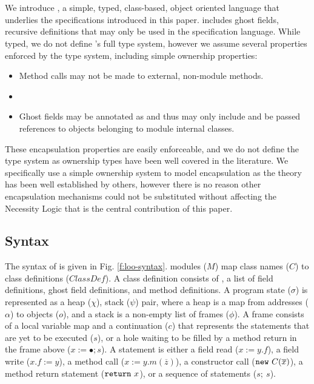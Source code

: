 
\section{\Loo}
\label{app:loo}


We introduce \Loo, a simple, typed, class-based, object oriented language that underlies the \Nec specifications
introduced in this paper. \Loo includes ghost fields, recursive definitions that may only be
used in the specification language.
While typed, we do not define \Loo's
full type system, however we assume several properties enforced by the type system, including 
simple ownership properties:
\begin{itemize}
\item
Method calls may not be made to external, non-module methods.
\item
{}
\item
Ghost fields may be annotated as  and thus may only include and be passed references to objects belonging to module internal classes.
\end{itemize}
These encapsulation properties are easily enforceable, and we
do not define the type system as ownership types have been 
well covered in the literature. 
We specifically use a simple ownership system to model 
encapsulation as the theory has been well established by others, 
however there is no reason other encapsulation mechanisms could 
not be substituted without affecting the Necessity Logic that 
is the central contribution of this paper.

\subsection{Syntax}
The syntax of \Loo is given in Fig. \ref{f:loo-syntax}.
\Loo modules ($M$) map class names ($C$) to class definitions ($\textit{ClassDef}$).
A class definition consists of ,
a list of field definitions, ghost field definitions, and method definitions.
A program state ($\sigma$) is represented as a heap ($\chi$), stack ($\psi$) pair, 
where a heap is a map from addresses ($\alpha$) to objects ($o$), and a stack is a non-empty list of frames ($\phi$). A frame consists of a local variable
map and a continuation ($c$) that represents the statements that are yet to be executed ($s$),
or a hole waiting to be filled by a method return in the frame above ($x := \bullet; s$).
A statement is either a field read ($x := y.f$), a field write ($x.f := y$), a method call
($x := y.m(\overline{z})$), a constructor call ($\prg{new}\ C(\overline{x})$), a method return statement
(${\texttt{return}}\ x$), or a sequence of statements ($s;\ s$).

